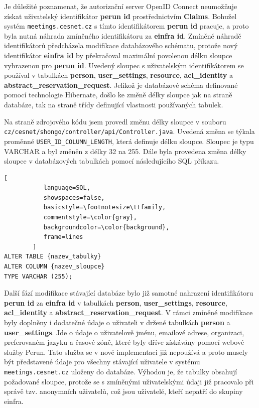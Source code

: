 \documentclass[
  printed, %
  twoside, %
  table,   %
  nolof,     %
  nolot,     %
]{fithesis3}
\begin{document}
Je důležité poznamenat, že autorizační server OpenID Connect neumožňuje získat uživatelský identifikátor \textbf{perun id} prostřednictvím \textbf{Claims}. Bohužel systém \texttt{meetings.cesnet.cz} s tímto identifikátorem \textbf{perun id} pracuje, a proto byla nutná náhrada zmíněného identifikátoru za \textbf{einfra id}. Zmíněné náhradě identifikátorů předcházela modifikace databázového schématu, protože nový identifikátor \textbf{einfra id} by překračoval maximální povolenou délku sloupce vyhrazenou pro \textbf{perun id}. Uvedený sloupec s uživatelským identifikátorem se používal v tabulkách \textbf{person}, \textbf{user\_settings}, \textbf{resource}, \textbf{acl\_identity} a \textbf{abstract\_reservation\_request}. Jelikož je databázové schéma definované pomocí technologie Hibernate, došlo ke změně délky sloupce jak na straně databáze, tak na straně třídy definující vlastnosti používaných tabulek. 
\par  
Na straně zdrojového kódu jsem provedl změnu délky sloupce v souboru \texttt{cz/cesnet/shongo/controller/api/Controller.java}. Uvedená změna se týkala proměnné \texttt{USER\_ID\_COLUMN\_LENGTH}, která definuje délku sloupce. Sloupec je typu VARCHAR a byl změněn z délky 32 na 255. Dále byla provedena změna délky sloupce v databázových tabulkách pomocí následujícího SQL příkazu.

\begin{lstlisting}[
           language=SQL,
           showspaces=false,
           basicstyle=\footnotesize\ttfamily,
           commentstyle=\color{gray},
           backgroundcolor=\color{background},
           frame=lines
        ]
ALTER TABLE {nazev_tabulky}  
ALTER COLUMN {nazev_sloupce}
TYPE VARCHAR (255);
\end{lstlisting}

Další fází modifikace stávající databáze bylo již samotné nahrazení identifikátoru \textbf{perun id} za \textbf{einfra id} v tabulkách \textbf{person}, \textbf{user\_settings}, \textbf{resource}, \textbf{acl\_identity} a \textbf{abstract\_reservation\_request}. V rámci zmíněné modifikace byly doplněny i dodatečné údaje o uživateli v držené tabulkách \textbf{person} a \textbf{user\_settings}. Jde o údaje o uživatelově jménu, emailové adrese, organizaci, preferovaném jazyku a časové zóně, které byly dříve získávány pomocí webové služby Perun. Tato služba se v nové implementaci již nepoužívá a proto musely být představené údaje pro všechny stávající uživatele v systému \texttt{meetings.cesnet.cz} uloženy do databáze. Výhodou je, že tabulky obsahují požadované sloupce, protože se s zmíněnými uživatelskými údaji již pracovalo při správě tzv. anonymních uživatelů, což jsou uživatelé, kteří nepatří do skupiny einfra. 
\par
\end{document}
